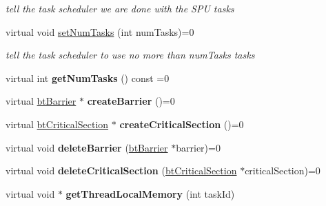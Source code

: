 \begin{DoxyCompactItemize}
\begin{DoxyCompactList}\small\item\em tell the task scheduler we are done with the S\+P\+U tasks \end{DoxyCompactList}\item 
\hypertarget{classbt_thread_support_interface_a775436d1d71cc85639847d217aca78e6}{virtual void \hyperlink{classbt_thread_support_interface_a775436d1d71cc85639847d217aca78e6}{set\+Num\+Tasks} (int num\+Tasks)=0}\label{classbt_thread_support_interface_a775436d1d71cc85639847d217aca78e6}

\begin{DoxyCompactList}\small\item\em tell the task scheduler to use no more than num\+Tasks tasks \end{DoxyCompactList}\item 
\hypertarget{classbt_thread_support_interface_acff24c922ddfd3d8b3a4353a8c03755d}{virtual int {\bfseries get\+Num\+Tasks} () const =0}\label{classbt_thread_support_interface_acff24c922ddfd3d8b3a4353a8c03755d}

\item 
\hypertarget{classbt_thread_support_interface_a227d5e777627f37d99a4301dfc88c618}{virtual \hyperlink{classbt_barrier}{bt\+Barrier} $\ast$ {\bfseries create\+Barrier} ()=0}\label{classbt_thread_support_interface_a227d5e777627f37d99a4301dfc88c618}

\item 
\hypertarget{classbt_thread_support_interface_a503dbd240c46fdf8a2c7bfe396f2e92d}{virtual \hyperlink{classbt_critical_section}{bt\+Critical\+Section} $\ast$ {\bfseries create\+Critical\+Section} ()=0}\label{classbt_thread_support_interface_a503dbd240c46fdf8a2c7bfe396f2e92d}

\item 
\hypertarget{classbt_thread_support_interface_abea87baf684bbf17d55491712b49007a}{virtual void {\bfseries delete\+Barrier} (\hyperlink{classbt_barrier}{bt\+Barrier} $\ast$barrier)=0}\label{classbt_thread_support_interface_abea87baf684bbf17d55491712b49007a}

\item 
\hypertarget{classbt_thread_support_interface_abfacf16e211a97d4f52a14330133e780}{virtual void {\bfseries delete\+Critical\+Section} (\hyperlink{classbt_critical_section}{bt\+Critical\+Section} $\ast$critical\+Section)=0}\label{classbt_thread_support_interface_abfacf16e211a97d4f52a14330133e780}

\item 
\hypertarget{classbt_thread_support_interface_a9870ef95be61b71ddef44640b9bf4a15}{virtual void $\ast$ {\bfseries get\+Thread\+Local\+Memory} (int task\+Id)}\label{classbt_thread_support_interface_a9870ef95be61b71ddef44640b9bf4a15}

\end{DoxyCompactItemize}


